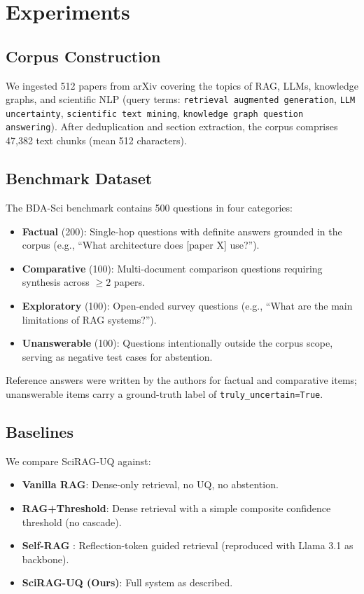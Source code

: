 \documentclass[conference]{IEEEtran}
\begin{document}
\section{Experiments}
\label{sec:experiments}

\subsection{Corpus Construction}

We ingested 512 papers from arXiv covering the topics of RAG, LLMs, knowledge
graphs, and scientific NLP (query terms: \texttt{retrieval augmented generation},
\texttt{LLM uncertainty}, \texttt{scientific text mining}, \texttt{knowledge
graph question answering}). After deduplication and section extraction, the
corpus comprises 47,382 text chunks (mean 512 characters).

\subsection{Benchmark Dataset}

The BDA-Sci benchmark contains 500 questions in four categories:
\begin{itemize}
    \item \textbf{Factual} (200): Single-hop questions with definite answers
          grounded in the corpus (e.g., ``What architecture does [paper X] use?'').
    \item \textbf{Comparative} (100): Multi-document comparison questions
          requiring synthesis across $\geq 2$ papers.
    \item \textbf{Exploratory} (100): Open-ended survey questions
          (e.g., ``What are the main limitations of RAG systems?'').
    \item \textbf{Unanswerable} (100): Questions intentionally outside the
          corpus scope, serving as negative test cases for abstention.
\end{itemize}

Reference answers were written by the authors for factual and comparative
items; unanswerable items carry a ground-truth label of \texttt{truly\_uncertain=True}.

\subsection{Baselines}

We compare SciRAG-UQ against:
\begin{itemize}
    \item \textbf{Vanilla RAG}: Dense-only retrieval, no UQ, no abstention.
    \item \textbf{RAG+Threshold}: Dense retrieval with a simple composite
          confidence threshold (no cascade).
    \item \textbf{Self-RAG} \cite{asai2023selfrag}: Reflection-token guided
          retrieval (reproduced with Llama 3.1 as backbone).
    \item \textbf{SciRAG-UQ (Ours)}: Full system as described.
\end{itemize}
\end{document}
